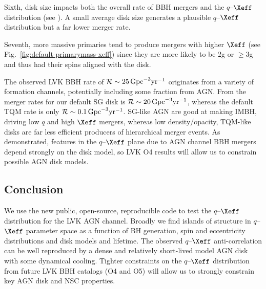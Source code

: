 Sixth, disk size impacts both the overall rate of BBH mergers and the $q$--$\Xeff$ distribution (see ).
A small average disk size generates a plausible $q$--$\Xeff$ distribution but a far lower merger rate.

Seventh, more massive primaries tend to produce mergers with higher $\Xeff$ (see Fig.~\ref{fig:default-primarymass-xeff}) since they are more likely to be 2g or $\geq$3g and thus had their spins aligned with the disk.

The observed LVK BBH rate of $\mathcal{R} \sim 25\,{\rm Gpc}^{-3} {\rm yr}^{-1}$ \citep{Abbott+23-O3b} originates from a variety of formation channels, potentially including some fraction from AGN.
From \citet{McKernan+25-mcfactsI} the merger rates for our default SG disk is $\mathcal{R} \sim 20\,{\rm Gpc}^{-3} \rm{yr}^{-1}$, whereas the default TQM rate is only $\mathcal{R} \sim 0.1\,{\rm Gpc}^{-3} \rm{yr}^{-1}$.
SG-like AGN are good at making IMBH, driving low $q$ and high $\Xeff$ mergers, whereas low density/opacity, TQM-like disks are far less efficient producers of hierarchical merger events.
As demonstrated, features in the $q$--$\Xeff$ plane due to AGN channel BBH mergers depend strongly on the disk model, so LVK O4 results will allow us to constrain possible AGN disk models.

 


\subsection{Conclusion}
\label{sec:conclusion-ch2}
We use the new public, open-source, reproducible code  to test the $q$--$\Xeff$ distribution for the LVK AGN channel.
Broadly we find islands of structure in $q$--$\Xeff$ parameter space as a function of BH generation, spin and eccentricity distributions and disk models and lifetime.
The observed $q$--$\Xeff$ anti-correlation can be well reproduced by a dense and relatively short-lived model AGN disk with some dynamical cooling.
Tighter constraints on the $q$--$\Xeff$ distribution from future LVK BBH catalogs (O4 and O5) will allow us to strongly constrain key AGN disk and NSC properties.

